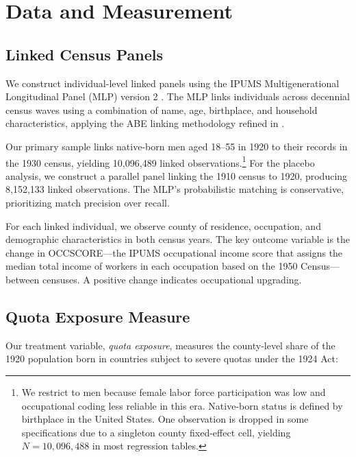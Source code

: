 \documentclass[12pt]{article}
\begin{document}

\section{Data and Measurement}
\label{sec:data}

\subsection{Linked Census Panels}

We construct individual-level linked panels using the IPUMS Multigenerational Longitudinal Panel (MLP) version 2 \citep{ruggles2024}. The MLP links individuals across decennial census waves using a combination of name, age, birthplace, and household characteristics, applying the ABE linking methodology refined in \citet{abramitzky2021}.

Our primary sample links native-born men aged 18--55 in 1920 to their records in the 1930 census, yielding 10,096,489 linked observations.\footnote{We restrict to men because female labor force participation was low and occupational coding less reliable in this era. Native-born status is defined by birthplace in the United States. One observation is dropped in some specifications due to a singleton county fixed-effect cell, yielding $N = 10{,}096{,}488$ in most regression tables.} For the placebo analysis, we construct a parallel panel linking the 1910 census to 1920, producing 8,152,133 linked observations. The MLP's probabilistic matching is conservative, prioritizing match precision over recall.

For each linked individual, we observe county of residence, occupation, and demographic characteristics in both census years. The key outcome variable is the change in OCCSCORE---the IPUMS occupational income score that assigns the median total income of workers in each occupation based on the 1950 Census---between censuses. A positive change indicates occupational upgrading.

\subsection{Quota Exposure Measure}

Our treatment variable, \textit{quota exposure}, measures the county-level share of the 1920 population born in countries subject to severe quotas under the 1924 Act:
\end{document}
